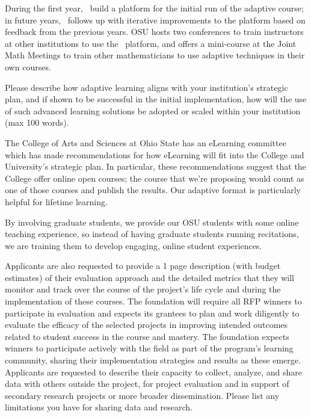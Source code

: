 During the first year, \gratisu\ build a platform for the initial run
of the adaptive course; in future years, \gratisu\ follows up with
iterative improvements to the platform based on feedback from the
previous years.  OSU hosts two conferences to train instructors at
other institutions to use the \gratisu\ platform, and offers a
mini-course at the Joint Math Meetings to train other mathematicians
to use adaptive techniques in their own courses.

\begin{question}
Please describe how adaptive learning aligns with your
institution’s strategic plan, and if shown to be successful in the
initial implementation, how will the use of such advanced learning
solutions be adopted or scaled within your institution (max 100
words).
\end{question}

The College of Arts and Sciences at Ohio State has an eLearning
committee which has made recommendations for how eLearning will fit
into the College and University's strategic plan.  In particular,
these recommendations suggest that the College offer online open
courses; the course that we're proposing would count as one of those
courses and publish the results.  Our adaptive format is particularly
helpful for lifetime learning.

By involving graduate students, we provide our OSU students with some
online teaching experience, so instead of having graduate students
running recitations, we are training them to develop engaging, online
student experiences.

\begin{question}
Applicants are also requested to provide a 1 page description
(with budget estimates) of their evaluation approach and the
detailed metrics that they will monitor and track over the course of
the project’s life cycle and during the implementation of these
courses. The foundation will require all RFP winners to participate
in evaluation and expects its grantees to plan and work diligently
to evaluate the efficacy of the selected projects in improving
intended outcomes related to student success in the course and
mastery. The foundation expects winners to participate actively with
the field as part of the program’s learning community, sharing their
implementation strategies and results as these emerge. Applicants
are requested to describe their capacity to collect, analyze, and
share data with others outside the project, for project evaluation
and in support of secondary research projects or more broader
dissemination. Please list any limitations you have for sharing data
and research.
\end{question}

